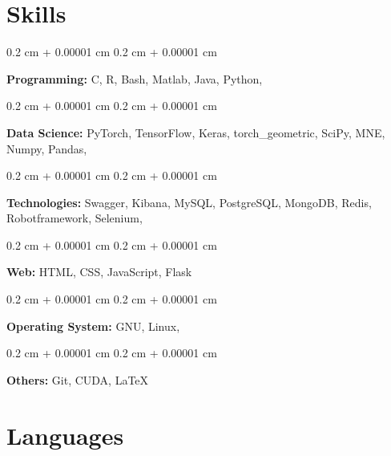 \documentclass[10pt, letterpaper]{article}
\newenvironment{onecolentry}{
    \begin{adjustwidth}{
        0.2 cm + 0.00001 cm
    }{
        0.2 cm + 0.00001 cm
    }
}{
    \end{adjustwidth}
} %
\begin{document}
    
    \section{Skills}



        
        \begin{onecolentry}
            \textbf{Programming:} C, R, Bash, Matlab, Java, Python,
        \end{onecolentry}

        \vspace{0.2 cm}
        
        \begin{onecolentry}
        	\textbf{Data Science:} PyTorch, TensorFlow, Keras, torch\_geometric, SciPy, MNE, Numpy, Pandas,
        \end{onecolentry}
        
        \vspace{0.2 cm}
        
        \begin{onecolentry}
            \textbf{Technologies:} Swagger, Kibana, MySQL, PostgreSQL, MongoDB, Redis, Robotframework, Selenium,
        \end{onecolentry}
        
        \vspace{0.2 cm}
        
        \begin{onecolentry}
        	\textbf{Web:} HTML, CSS, JavaScript, Flask
        \end{onecolentry}
        
        \vspace{0.2 cm}
        
         \begin{onecolentry}
        	\textbf{Operating System:} GNU, Linux,
        \end{onecolentry}
        
        \vspace{0.2 cm}
        
        \begin{onecolentry}
        	\textbf{Others:} Git, CUDA, \LaTeX
        \end{onecolentry}
        
        \vspace{0.2 cm}


\section{Languages}
\end{document}
